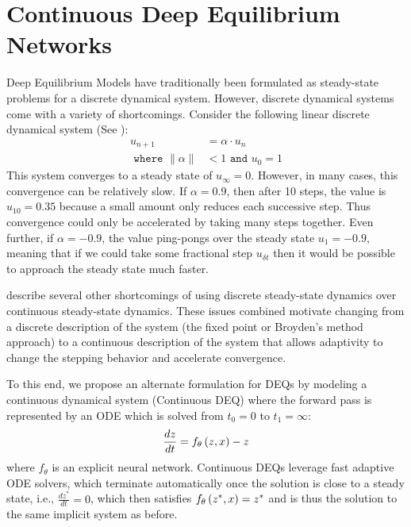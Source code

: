 
\section{Continuous Deep Equilibrium Networks}
\label{sec:continuous_deqs}

Deep Equilibrium Models have traditionally been formulated as steady-state problems for a discrete dynamical system. However, discrete dynamical systems come with a variety of shortcomings. Consider the following linear discrete dynamical system (See ):
%
\begin{align}
    u_{n + 1} &= \alpha \cdot u_n \\
    \texttt{ where } \|\alpha\| &< 1 \texttt{ and } u_0 = 1
\end{align}
%
This system converges to a steady state of $u_\infty = 0$. However, in many cases, this convergence can be relatively slow. If $\alpha = 0.9$, then after 10 steps, the value is $u_{10} = 0.35$ because a small amount only reduces each successive step. Thus convergence could only be accelerated by taking many steps together. Even further, if $\alpha = -0.9$, the value ping-pongs over the steady state $u_{1} = -0.9$, meaning that if we could take some fractional step $u_{\delta t}$ then it would be possible to approach the steady state much faster.


\citet{rico1992discrete, bulsari1995neural} describe several other shortcomings of using discrete steady-state dynamics over continuous steady-state dynamics. These issues combined motivate changing from a discrete description of the system (the fixed point or Broyden's method approach) to a continuous description of the system that allows adaptivity to change the stepping behavior and accelerate convergence.

To this end, we propose an alternate formulation for DEQs by modeling a continuous dynamical system (Continuous DEQ) where the forward pass is represented by an ODE which is solved from $t_0 = 0$ to $t_1 = \infty$:
%
\begin{equation}
    \frac{dz}{dt} = f_\theta\left(z, x\right) - z
\end{equation}
%
where $f_\theta$ is an explicit neural network. Continuous DEQs leverage fast adaptive ODE solvers, which terminate automatically once the solution is close to a steady state, i.e., $\frac{dz^*}{dt} = 0$, which then satisfies $f_\theta\left(z^*, x\right) = z^*$ and is thus the solution to the same implicit system as before.

